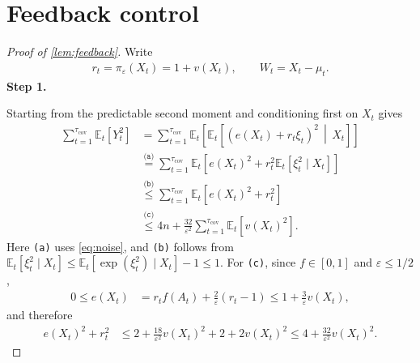 \documentclass[11pt]{article}
\newcommand{\proofstepinline}[1]{%
    {\sffamily\bfseries\color{blue!55!black}Step #1.}\enspace
}
\newcommand{\reason}[1]{\texttt{(#1)}}
\newcommand{\explan}[2]{\stackrel{\reason{#2}}{#1}}
\newcommand{\E}{\mathbb E}
\newcommand{\1}{\mathbf 1}
\newcommand{\eps}{\varepsilon}
\begin{document}
\section{Feedback control}
\label{app:feedback}
\begin{proof}[Proof of \cref{lem:feedback}]
    Write
    \begin{align}
        r_t=\pi_\eps(X_t)=1+v(X_t),
        \qquad
        W_t=X_t-\mu_t.
    \end{align}
    \proofstepinline{1}
    Starting from the predictable second moment and conditioning first on
    $X_t$ gives
    \begin{align}
        \sum_{t=1}^{\tau_{\mathrm{cov}}}\E_t[Y_t^2]
         & =
        \sum_{t=1}^{\tau_{\mathrm{cov}}}
        \E_t\left[
            \E_t\left[
                \left(e(X_t)+r_t\xi_t\right)^2
                \,\middle|\,X_t
                \right]
            \right]
        \nonumber           \\
         & \explan{=}{a}
        \sum_{t=1}^{\tau_{\mathrm{cov}}}
        \E_t\left[
            e(X_t)^2
            +
            r_t^2\E_t[\xi_t^2\mid X_t]
            \right]
        \nonumber           \\
         & \explan{\leq}{b}
        \sum_{t=1}^{\tau_{\mathrm{cov}}}
        \E_t\left[
            e(X_t)^2+r_t^2
            \right]
        \nonumber           \\
         & \explan{\leq}{c}
        4n
        +
        \frac{32}{\eps^2}
        \sum_{t=1}^{\tau_{\mathrm{cov}}}
        \E_t[v(X_t)^2].
        \label{eq:feedback-start}
    \end{align}
    Here \reason{a} uses \eqref{eq:noise},
    and \reason{b} follows from
    $\E_t[\xi_t^2\mid X_t]
        \leq
        \E_t[\exp(\xi_t^2)\mid X_t]-1
        \leq1$.
    For \reason{c}, since $f\in[0,1]$ and $\eps\leq1/2$,
    \begin{align}
        0\leq e(X_t)
         & =
        r_tf(A_t)+\frac2\eps(r_t-1)
        \leq
        1+\frac3\eps v(X_t),
    \end{align}
    and therefore
    \begin{align}
        e(X_t)^2+r_t^2
         & \leq
        2+\frac{18}{\eps^2}v(X_t)^2
        +2+2v(X_t)^2
        \leq
        4+\frac{32}{\eps^2}v(X_t)^2.
    \end{align}


\end{proof}
\end{document}
